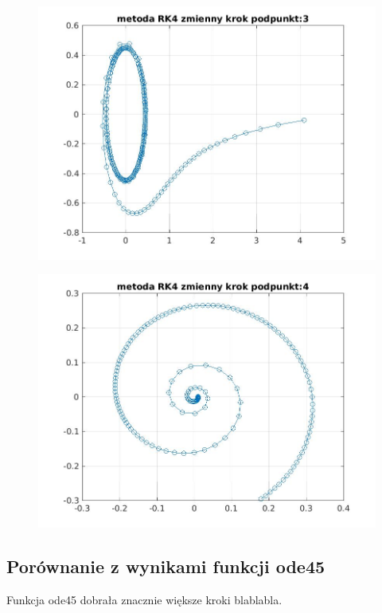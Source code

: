 \documentclass[a4paper, 11pt]{article}
\begin{document}
\begin{figure}[htp]
\centering
\includegraphics[width = 15cm]{2d/metoda RK4 zmienny krok podpunkt:3.jpg}
\end{figure}
\begin{figure}[htp]
\centering
\includegraphics[width = 15cm]{2d/metoda RK4 zmienny krok podpunkt:4.jpg}
\end{figure}

\subsection{Porównanie z wynikami funkcji ode45}
Funkcja ode45 dobrała znacznie większe kroki blablabla. 
\end{document}
